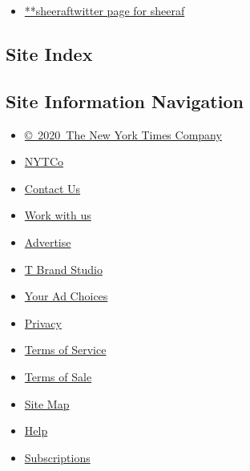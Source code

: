 \begin{itemize}
\tightlist
\item
  \href{https://twitter.com/sheeraf}{**sheeraftwitter page for sheeraf}
\end{itemize}

\hypertarget{site-index}{%
\subsection{Site Index}\label{site-index}}

\hypertarget{site-information-navigation}{%
\subsection{Site Information
Navigation}\label{site-information-navigation}}

\begin{itemize}
\tightlist
\item
  \href{https://help.nytimes3xbfgragh.onion/hc/en-us/articles/115014792127-Copyright-notice}{©~2020~The
  New York Times Company}
\end{itemize}

\begin{itemize}
\tightlist
\item
  \href{https://www.nytco.com/}{NYTCo}
\item
  \href{https://help.nytimes3xbfgragh.onion/hc/en-us/articles/115015385887-Contact-Us}{Contact
  Us}
\item
  \href{https://www.nytco.com/careers/}{Work with us}
\item
  \href{https://nytmediakit.com/}{Advertise}
\item
  \href{http://www.tbrandstudio.com/}{T Brand Studio}
\item
  \href{https://www.nytimes3xbfgragh.onion/privacy/cookie-policy\#how-do-i-manage-trackers}{Your
  Ad Choices}
\item
  \href{https://www.nytimes3xbfgragh.onion/privacy}{Privacy}
\item
  \href{https://help.nytimes3xbfgragh.onion/hc/en-us/articles/115014893428-Terms-of-service}{Terms
  of Service}
\item
  \href{https://help.nytimes3xbfgragh.onion/hc/en-us/articles/115014893968-Terms-of-sale}{Terms
  of Sale}
\item
  \href{https://spiderbites.nytimes3xbfgragh.onion}{Site Map}
\item
  \href{https://help.nytimes3xbfgragh.onion/hc/en-us}{Help}
\item
  \href{https://www.nytimes3xbfgragh.onion/subscription?campaignId=37WXW}{Subscriptions}
\end{itemize}
